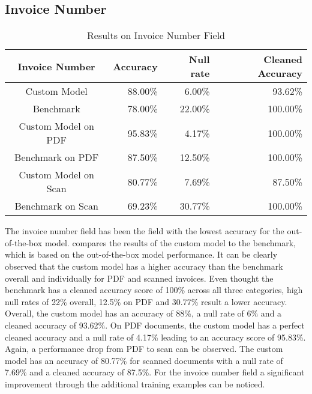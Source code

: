 \subsection*{Invoice Number}
\begin{table}[ht]   %
    \centering
    \footnotesize
    \begin{tabular}{c|rrr} %
        \toprule    %
        Invoice Number  & Accuracy  & Null rate & Cleaned Accuracy \\
        \midrule    %
        Custom Model               & 88.00\%   & 6.00\%   & 93.62\% \\
        Benchmark           & 78.00\%   & 22.00\%  & 100.00\%\\
        \midrule    %
        Custom Model on PDF        & 95.83\%   & 4.17\%  & 100.00\% \\
        Benchmark on PDF    & 87.50\%   & 12.50\%  & 100.00\% \\
        \midrule    %
        Custom Model on Scan       & 80.77\%  & 7.69\%   & 87.50\% \\
        Benchmark on Scan   & 69.23\%  & 30.77\%  & 100.00\% \\

        \bottomrule %
    \end{tabular}
    \caption{Results on Invoice Number Field}
    \label{table:Model_Bench_Number}
\end{table}

The invoice number field has been the field with the lowest accuracy for the out-of-the-box model. 
 compares the results of the custom model to the benchmark, which is based on the out-of-the-box model performance.
It can be clearly observed that the custom model has a higher accuracy than the benchmark overall and individually for PDF and scanned invoices. 
Even thought the benchmark has a cleaned accuracy score of 100\% across all three categories, high null rates of 22\% overall, 12.5\% on PDF and 30.77\% result a lower accuracy.
Overall, the custom model has an accuracy of 88\%, a null rate of 6\% and a cleaned accuracy of 93.62\%. 
On PDF documents, the custom model has a perfect cleaned accuracy and a null rate of 4.17\% leading to an accuracy score of 95.83\%.
Again, a performance drop from PDF to scan can be observed. The custom model has an accuracy of 80.77\% for scanned documents with a null rate of 7.69\% and a cleaned accuracy of 87.5\%.
For the invoice number field a significant improvement through the additional training examples can be noticed.

